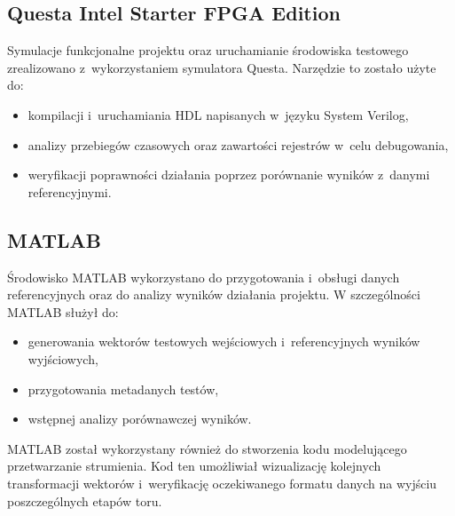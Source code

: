 \subsection{Questa Intel Starter FPGA Edition}
Symulacje funkcjonalne projektu oraz uruchamianie środowiska testowego zrealizowano z~wykorzystaniem symulatora Questa. Narzędzie to zostało użyte do:
\begin{itemize}
    \item kompilacji i~uruchamiania  HDL napisanych w~języku System Verilog,
    \item analizy przebiegów czasowych oraz zawartości rejestrów w~celu debugowania,
    \item weryfikacji poprawności działania poprzez porównanie wyników z~danymi referencyjnymi.
\end{itemize}

\subsection{MATLAB}
Środowisko MATLAB wykorzystano do przygotowania i~obsługi danych referencyjnych oraz do analizy wyników działania projektu. W szczególności MATLAB służył do:
\begin{itemize}
    \item generowania wektorów testowych wejściowych i~referencyjnych wyników wyjściowych,
    \item przygotowania metadanych testów,
    \item wstępnej analizy porównawczej wyników.
\end{itemize}

MATLAB został wykorzystany również do stworzenia kodu modelującego przetwarzanie strumienia. Kod ten umożliwiał wizualizację kolejnych transformacji wektorów i~weryfikację oczekiwanego formatu danych na wyjściu poszczególnych etapów toru.
